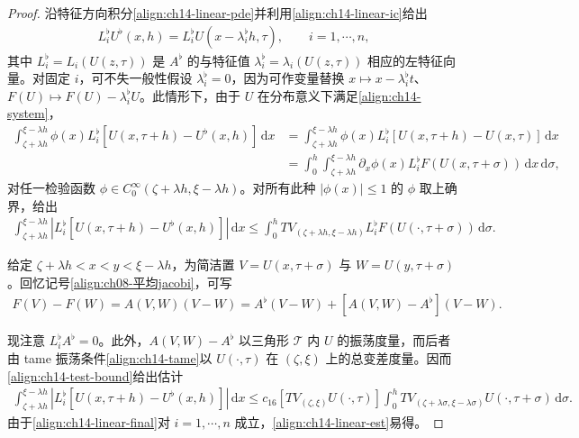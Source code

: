\documentclass[../../main.tex]{subfiles}
\begin{document}
\begin{proof}
沿特征方向积分\eqref{align:ch14-linear-pde}并利用\eqref{align:ch14-linear-ic}给出
\begin{align}
L_i^\flat U^\flat(x,h)=L_i^\flat U(x-\lambda_i^\flat h,\tau),\qquad i=1,\cdots,n,
\label{align:ch14-char}
\end{align}
其中 $L_i^\flat=L_i(U(z,\tau))$ 是 $A^\flat$ 的与特征值 $\lambda_i^\flat=\lambda_i(U(z,\tau))$ 相应的左特征向量。对固定 $i$，可不失一般性假设 $\lambda_i^\flat=0$，因为可作变量替换 $x\mapsto x-\lambda_i^\flat t$、$F(U)\mapsto F(U)-\lambda_i^\flat U$。此情形下，由于 $U$ 在分布意义下满足\eqref{align:ch14-system}，
\begin{align}
\int_{\zeta+\lambda h}^{\xi-\lambda h}\phi(x)L_i^\flat[U(x,\tau+h)-U^\flat(x,h)]\,\mathrm{d}x&=\int_{\zeta+\lambda h}^{\xi-\lambda h}\phi(x)L_i^\flat[U(x,\tau+h)-U(x,\tau)]\,\mathrm{d}x\nonumber\\
&=\int_0^h\int_{\zeta+\lambda h}^{\xi-\lambda h}\partial_x\phi(x)L_i^\flat F(U(x,\tau+\sigma))\,\mathrm{d}x\,\mathrm{d}\sigma,
\label{align:ch14-test}
\end{align}
对任一检验函数 $\phi\in C_0^\infty(\zeta+\lambda h,\xi-\lambda h)$。对所有此种 $|\phi(x)|\leqslant1$ 的 $\phi$ 取上确界，给出
\begin{align}
\int_{\zeta+\lambda h}^{\xi-\lambda h}|L_i^\flat[U(x,\tau+h)-U^\flat(x,h)]|\,\mathrm{d}x\leqslant\int_0^h TV_{(\zeta+\lambda h,\xi-\lambda h)}L_i^\flat F(U(\cdot,\tau+\sigma))\,\mathrm{d}\sigma.
\label{align:ch14-test-bound}
\end{align}

给定 $\zeta+\lambda h<x<y<\xi-\lambda h$，为简洁置 $V=U(x,\tau+\sigma)$ 与 $W=U(y,\tau+\sigma)$。回忆记号\eqref{align:ch08-平均jacobi}，可写
\begin{align}
F(V)-F(W)=A(V,W)(V-W)=A^\flat(V-W)+[A(V,W)-A^\flat](V-W).
\label{align:ch14-flux-decomp}
\end{align}



现注意 $L_i^\flat A^\flat=0$。此外，$A(V,W)-A^\flat$ 以三角形 $\mathscr{T}$ 内 $U$ 的振荡度量，而后者由 tame 振荡条件\eqref{align:ch14-tame}以 $U(\cdot,\tau)$ 在 $(\zeta,\xi)$ 上的总变差度量。因而\eqref{align:ch14-test-bound}给出估计
\begin{align}
\int_{\zeta+\lambda h}^{\xi-\lambda h}|L_i^\flat[U(x,\tau+h)-U^\flat(x,h)]|\,\mathrm{d}x\leqslant c_{16}[TV_{(\zeta,\xi)}U(\cdot,\tau)]\int_0^h TV_{(\zeta+\lambda\sigma,\xi-\lambda\sigma)}U(\cdot,\tau+\sigma)\,\mathrm{d}\sigma.
\label{align:ch14-linear-final}
\end{align}
由于\eqref{align:ch14-linear-final}对 $i=1,\cdots,n$ 成立，\eqref{align:ch14-linear-est}易得。


\end{proof}
\end{document}
